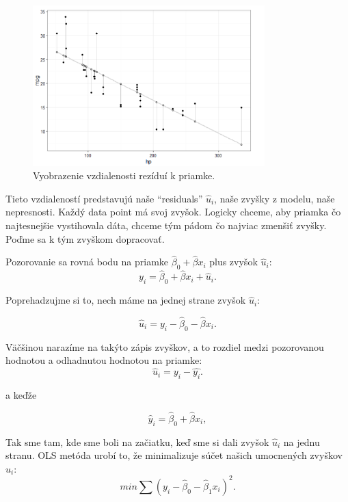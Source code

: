 \begin{figure}
\begin{center}
\includegraphics[width=0.8\textwidth,height=\textheight]{diplomka obrazky/4.png}
\caption{Vyobrazenie vzdialenosti rezíduí k priamke.}
\end{center}
\end{figure}

Tieto vzdialeností predstavujú naše ``residuals'' \(\hat{u}_i\), naše
zvyšky z modelu, naše nepresnosti. Každý data point má svoj zvyšok.
Logicky chceme, aby priamka čo najtesnejšie vystihovala dáta, chceme tým
pádom čo najviac zmenšiť zvyšky. Poďme sa k tým zvyškom dopracovať.

Pozorovanie sa rovná bodu na priamke \(\hat\beta_0 + \hat\beta{x}_i\)
plus zvyšok \(\hat{u}_i\):
\[ y_i = \hat\beta_0 + \hat\beta{x}_i + \hat{u}_i.\]

\begin{center}

Poprehadzujme si to, nech máme na jednej strane zvyšok \(\hat{u}_i\):

\end{center}
\[ \hat{u}_i = y_i - \hat\beta_0 - \hat\beta{x}_i.\]

Väčšinou narazíme na takýto zápis zvyškov, a to rozdiel medzi
pozorovanou hodnotou a odhadnutou hodnotou na priamke:
\[\hat{u}_i = y_i - \hat{y_i}.\]

\begin{center}

a keďže
\end{center}
\[ \hat{y}_i =\hat\beta_0 + \hat\beta{x}_i,\]

Tak sme tam, kde sme boli na začiatku, keď sme si dali zvyšok
\(\hat{u}_i\) na jednu stranu. OLS metóda urobí to, že minimalizuje
súčet našich umocnených zvyškov \(\hat{u}_i\):
\[min\sum (y_i - \hat\beta_0 - \hat\beta_1{x}_i)^2.\]

